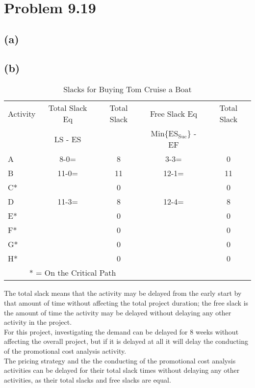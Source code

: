 \documentclass{article}
\begin{document}
	\section*{Problem 9.19}
	\subsection*{(a)}
	\begin{center}
	\makebox[\textwidth]{
		}
	\end{center}
	\pagebreak
	\subsection*{(b)}
	{\renewcommand{\arraystretch}{1.2} 
	\begin{table}[h!tbp]
  		\begin{center}
    		\caption{Slacks for Buying Tom Cruise a Boat}
    		\label{tab:table2}
			
    		\begin{tabular}{lcccc}
				Activity & Total Slack Eq & Total Slack & Free Slack Eq & Total Slack\\
				& LS - ES & & Min\{ES$_{\text{Suc}}$\} - EF & \\
				\hline
      			A & 8-0= & 8 & 3-3=& 0\\
      			B & 11-0= & 11 & 12-1= & 11\\
				C* && 0 && 0\\
				D & 11-3= & 8 & 12-4= & 8\\
				E* && 0 && 0\\
				F* && 0 && 0\\
				G* && 0 && 0\\
				H* && 0 && 0\\
				\hline
				\multicolumn{3}{c}{* = On the Critical Path}\\
    		\end{tabular}
  		\end{center}
	\end{table}
	}
	
	\noindent The total slack means that the activity may be delayed from the early start by that amount of time without affecting the total project duration; the free slack is the amount of time the activity may be delayed without delaying any other activity in the project.\\
	For this project, investigating the demand can be delayed for 8 weeks without affecting the overall project, but if it is delayed at all it will delay the conducting of the promotional cost analysis activity.\\
	The pricing strategy and the the conducting of the promotional cost analysis activities can be delayed for their total slack times without delaying any other activities, as their total slacks and free slacks are equal.
	
\end{document}

